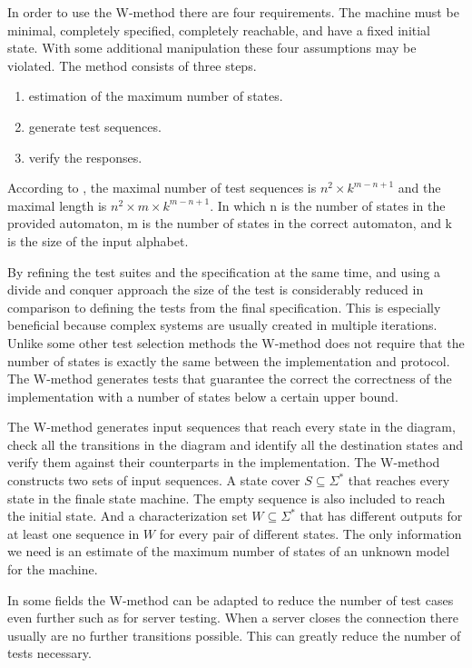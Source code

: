 \documentclass[multi,crop=false,class=article]{standalone}
\begin{document}
In order to use the W-method there are four requirements.
The machine must be minimal, completely specified, completely reachable, and have a fixed initial state.
With some additional manipulation these four assumptions may be violated.
The method consists of three steps.
\begin{enumerate}
\item estimation of the maximum number of states.
\item generate test sequences.
\item verify the responses.
\end{enumerate}

According to \cite{vasilevskii73}, the maximal number of test sequences is $n^{2} \times k^{m-n+1}$ and the maximal length is $n^{2} \times m \times k^{m-n+1}$.
In which n is the number of states in the provided automaton, m is the number of states in the correct automaton, and k is the size of the input alphabet.

By refining the test suites and the specification at the same time, and using a divide and conquer approach the size of the test is considerably reduced in comparison to defining the tests from the final specification\cite{Ipate07}.
This is especially beneficial because complex systems are usually created in multiple iterations.
Unlike some other test selection methods the W-method does not require that the number of states is exactly the same between the implementation and protocol.
The W-method generates tests that guarantee the correct the correctness of the implementation with a number of states below a certain upper bound.

The W-method generates input sequences that reach every state in the diagram, check all the transitions in the diagram and identify all the destination states and verify them against their counterparts in the implementation\cite{Ipate07}.
The W-method constructs two sets of input sequences.
A state cover $S \subseteq \Sigma^{*}$ that reaches every state in the finale state machine.
The empty sequence is also included to reach the initial state.
And a characterization set $W \subseteq \Sigma^{*}$ that has different outputs for at least one sequence in $W$ for every pair of different states.
The only information we need is an estimate of the maximum number of states of an unknown model for the machine.

In some fields the W-method can be adapted to reduce the number of test cases even further such as for server testing.
When a server closes the connection there usually are no further transitions possible.
This can greatly reduce the number of tests necessary\cite{deRuiter15}.
\end{document}
